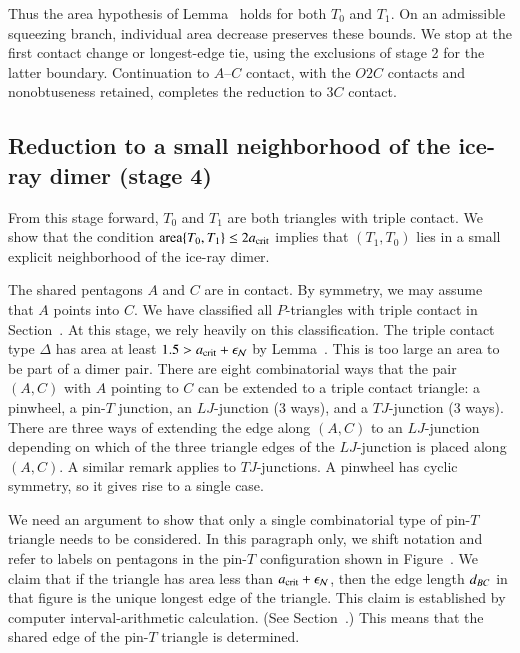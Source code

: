 Thus the area hypothesis of Lemma~ holds
for both $T_0$ and $T_1$.  On an admissible squeezing branch,
individual area decrease preserves these bounds.  We stop at the
first contact change or longest-edge tie, using the exclusions of
stage 2 for the latter boundary.  Continuation to $A$--$C$
contact, with the $O2C$ contacts and nonobtuseness retained,
completes the reduction to $3C$ contact.

\subsection{Reduction to a small neighborhood of the ice-ray
  dimer (stage 4)}

From this stage forward, $T_0$ and $T_1$ are both triangles with
triple contact.  We show that the condition ${\operatorname{area}}\{T_0,T_1\}\le
2a_\text{crit}$ implies that $(T_1,T_0)$ lies in a small explicit
neighborhood of the ice-ray dimer.

The shared pentagons $A$ and $C$ are in contact.  By symmetry, we may
assume that $A$ points into $C$.  We have classified all $P$-triangles
with triple contact in Section~.  At this stage, we
rely heavily on this classification.  The triple contact type $\Delta$
has area at least $1.5 > a_\text{crit}+\epsilon_{\mathcal N}$ by Lemma~.
This is too large an area to be part of a dimer pair.  There are eight
combinatorial ways that the pair $(A,C)$ with $A$ pointing to $C$ can
be extended to a triple contact triangle: a pinwheel, a pin-$T$
junction, an $LJ$-junction (3 ways), and a $TJ$-junction (3 ways).
There are three ways of extending the edge along $(A,C)$ to an
$LJ$-junction depending on which of the three triangle edges of the
$LJ$-junction is placed along $(A,C)$.  A similar remark applies to
$TJ$-junctions.  A pinwheel has cyclic symmetry, so it gives rise to a
single case.

We need an argument to show that only a single combinatorial type of
pin-$T$ triangle needs to be considered.  In this paragraph only, we
shift notation and refer to labels on pentagons in the pin-$T$
configuration shown in Figure~.  We claim that if
the triangle has area less than $a_\text{crit}+\epsilon_{\mathcal N}$, then the edge
length $d_{BC}$ in that figure is the unique longest edge of the
triangle.  This claim is established by computer interval-arithmetic calculation.  (See
Section~.)  This means that the shared edge of the
pin-$T$ triangle is determined.

